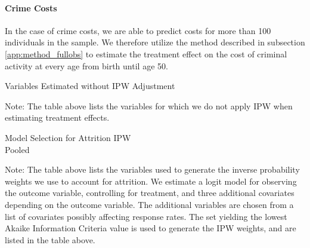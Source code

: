 \paragraph{Crime Costs}

\noindent In the case of crime costs, we are able to predict costs for more than 100 individuals in the
sample. We therefore utilize the method described in subsection \ref{app:method_fullobs}
to estimate the treatment effect on the cost of criminal activity at every age from birth until age 50. \\


\begin{table}[H]
\begin{threeparttable}
\caption{Variables Estimated without IPW Adjustment}
\label{table:nonipw}
\centering

\begin{tablenotes}
\footnotesize
\item Note: The table above lists the variables for which we do not apply IPW when estimating
treatment effects.
\end{tablenotes}
\end{threeparttable}
\end{table}



\begin{table}
\caption{Model Selection for Attrition IPW \\ Pooled }
\label{table:ms_attrit_pooled}
\centering
\begin{adjustbox}{max width=\textwidth}
\begin{threeparttable}

\begin{tablenotes}
\tiny
\item Note: The table above lists the variables used to generate the
inverse probability weights we use to account for attrition. We estimate a logit model for observing the outcome variable,
controlling for treatment, and three additional covariates depending on the outcome
variable. The additional variables are chosen from a list of covariates possibly affecting
response rates. The set yielding the lowest Akaike Information Criteria value is used to
generate the IPW weights, and are listed in the table above.
\end{tablenotes}
\end{threeparttable}
\end{adjustbox}
\end{table}

